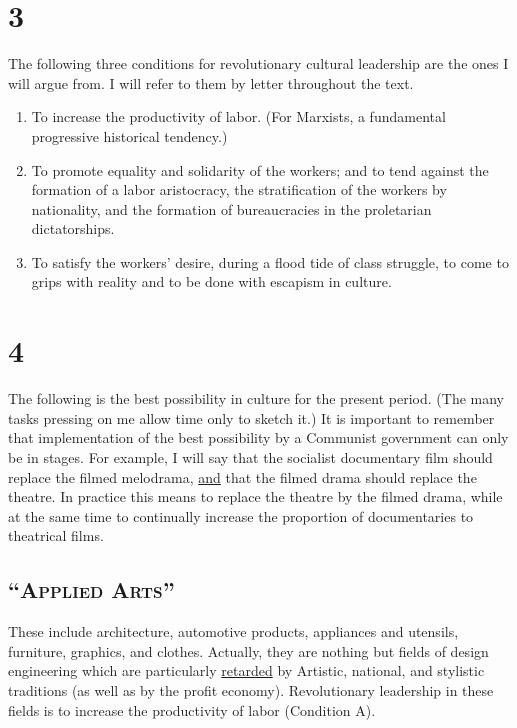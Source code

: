 \section*{3}

The following three conditions for revolutionary cultural leadership are the ones
I will argue from. I will refer to them by letter throughout the text. 
\begin{enumerate}[label=\Alph*., nosep, itemsep=0.5em]
\item To increase the productivity of labor. (For Marxists, a fundamental progressive historical tendency.) 
\item To promote equality and solidarity of the workers; and to tend against the formation of a labor aristocracy, the stratification of the workers by nationality, and the formation of bureaucracies in the proletarian dictatorships. 
\item To satisfy the workers' desire, during a flood tide of class struggle, to come to grips with reality and to be done with escapism in culture. 
\end{enumerate}

\section*{4}

The following is the best possibility in culture for the present 
period. (The many tasks pressing on me allow time only to sketch it.) 
It is important to remember that implementation of the best possibility
by a Communist government can only be in stages. For example, I will say
that the socialist documentary film should replace the filmed melodrama,
\uline{and} that the filmed drama should replace the theatre. In practice this
means to replace the theatre by the filmed drama, while at the same time
to continually increase the proportion of documentaries to theatrical 
films. 


\subsection*{\enquote{\textsc{Applied Arts}}}
These include architecture, automotive products, appliances and
utensils, furniture, graphics, and clothes. Actually, they are nothing
but fields of design engineering which are particularly \uline{retarded} 
by Artistic, national, and stylistic traditions (as well as by the profit
economy). Revolutionary leadership in these fields is to increase the
productivity of labor (Condition A). 


